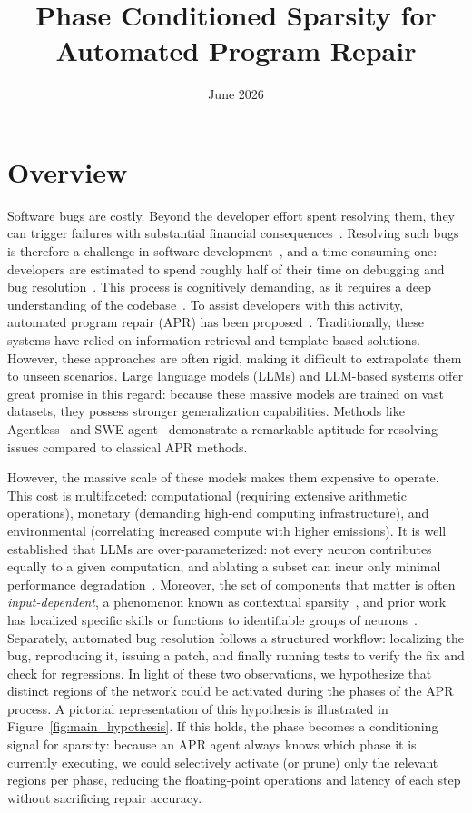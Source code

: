 \documentclass{article}
\title{Phase Conditioned Sparsity for Automated Program Repair}
\date{June 2026}
\begin{document}
\maketitle

\section{Overview}

Software bugs are costly. Beyond the developer effort spent resolving them, they can trigger failures with substantial financial consequences~\cite{BentonFCC2024, BusinessInsider2024, ZahnEtAl2024}. Resolving such bugs is therefore a challenge in software development~\cite{Zouz2020}, and a time-consuming one: developers are estimated to spend roughly half of their time on debugging and bug resolution~\cite{Britton2013}. This process is cognitively demanding, as it requires a deep understanding of the codebase~\cite{ByungDo1998,Hu2024}. To assist developers with this activity, automated program repair (APR) has been proposed~\cite{Gazzola2019}. Traditionally, these systems have relied on information retrieval and template-based solutions. However, these approaches are often rigid, making it difficult to extrapolate them to unseen scenarios. Large language models (LLMs) and LLM-based systems offer great promise in this regard: because these massive models are trained on vast datasets, they possess stronger generalization capabilities. Methods like Agentless~\cite{Xia2025} and SWE-agent~\cite{Yang2024sweagent} demonstrate a remarkable aptitude for resolving issues compared to classical APR methods.

However, the massive scale of these models makes them expensive to operate. This cost is multifaceted: computational (requiring extensive arithmetic operations), monetary (demanding high-end computing infrastructure), and environmental (correlating increased compute with higher emissions). It is well established that LLMs are over-parameterized: not every neuron contributes equally to a given computation, and ablating a subset can incur only minimal performance degradation~\cite{Voita2019, Sandovalsegura2026identifying, Dong2024promptprompted}. Moreover, the set of components that matter is often \emph{input-dependent}, a phenomenon known as contextual sparsity~\cite{Liu2023dejavu}, and prior work has localized specific skills or functions to identifiable groups of neurons~\cite{Wang2022skillneurons}. Separately, automated bug resolution follows a structured workflow: localizing the bug, reproducing it, issuing a patch, and finally running tests to verify the fix and check for regressions. In light of these two observations, we hypothesize that distinct regions of the network could be activated during the phases of the APR process. A pictorial representation of this hypothesis is illustrated in Figure~\ref{fig:main_hypothesis}. If this holds, the phase becomes a conditioning signal for sparsity: because an APR agent always knows which phase it is currently executing, we could selectively activate (or prune) only the relevant regions per phase, reducing the floating-point operations and latency of each step without sacrificing repair accuracy.
\end{document}
